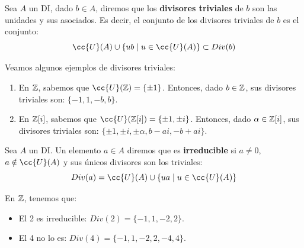 \begin{definicion}
    Sea $A$ un DI, dado $b \in A$, diremos que los \textbf{divisores triviales} de $b$ son las unidades y sus asociados.
    Es decir, el conjunto de los divisores triviales de $b$ es el conjunto:
    $$\cc{U}(A) \cup \{ub \mid u \in \cc{U}(A) \} \subset Div(b)$$
\end{definicion}

\begin{ejemplo} Veamos algunos ejemplos de divisores triviales:
\begin{enumerate}
    \item En $\mathbb Z$, sabemos que $\cc{U}(\Z)=\{\pm 1\}$. Entonces, dado $b \in \mathbb Z$, sus divisores triviales son: $\{-1, 1, -b, b\}$.

    \item En $\mathbb Z[i]$, sabemos que $\cc{U}(\Z[i])=\{\pm 1, \pm i\}$. Entonces, dado $\alpha \in \mathbb Z[i]$, sus divisores triviales son: $\{\pm 1, \pm i, \pm \alpha, b-ai, -b+ai\}$.
\end{enumerate}
\end{ejemplo}

\begin{definicion}[Irreducible]
    Sea $A$ un DI. Un elemento $a \in A$ diremos que es \textbf{irreducible} si $a \neq 0$, $a \notin \cc{U}(A)$ y sus únicos
    divisores son los triviales:
    $$Div(a) = \cc{U}(A) \cup \{ua \mid u \in \cc{U}(A) \}$$
\end{definicion}

\begin{ejemplo} En $\mathbb Z$, tenemos que:
\begin{itemize}
    \item El 2 es irreducible: $Div(2) = \{-1, 1, -2, 2\}$.
    \item El 4 no lo es: $Div(4) = \{-1, 1, -2, 2, -4, 4\}$.
\end{itemize}
\end{ejemplo}

